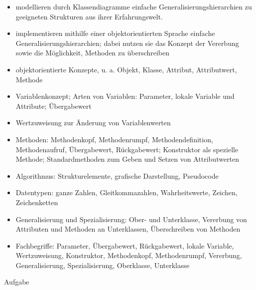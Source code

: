 \documentclass{bschlangaul-aufgabe}
\begin{document}
\begin{liKasten}
\begin{itemize}
\item modellieren durch Klassendiagramme einfache
Generalisierungshierarchien zu geeigneten Strukturen aus ihrer
Erfahrungswelt.

\item implementieren mithilfe einer objektorientierten Sprache einfache
Generalisierungshierarchien; dabei nutzen sie das Konzept der Vererbung
sowie die Möglichkeit, Methoden zu überschreiben
\end{itemize}


\begin{itemize}
\item objektorientierte Konzepte, u. a. Objekt, Klasse, Attribut,
Attributwert, Methode

\item Variablenkonzept; Arten von Variablen: Parameter, lokale Variable
und Attribute; Übergabewert

\item Wertzuweisung zur Änderung von Variablenwerten

\item Methoden: Methodenkopf, Methodenrumpf, Methodendefinition,
Methodenaufruf, Übergabewert, Rückgabewert; Konstruktor als spezielle
Methode; Standardmethoden zum Geben und Setzen von Attributwerten

\item Algorithmus: Strukturelemente, grafische Darstellung, Pseudocode

\item Datentypen: ganze Zahlen, Gleitkommazahlen, Wahrheitswerte,
Zeichen, Zeichenketten

\item Generalisierung und Spezialisierung: Ober- und Unterklasse,
Vererbung von Attributen und Methoden an Unterklassen, Überschreiben von
Methoden

\item Fachbegriffe: Parameter, Übergabewert, Rückgabewert, lokale
Variable, Wertzuweisung, Konstruktor, Methodenkopf, Methodenrumpf,
Vererbung, Generalisierung, Spezialisierung, Oberklasse, Unterklasse
\end{itemize}

\end{liKasten}
Aufgabe
\end{document}
